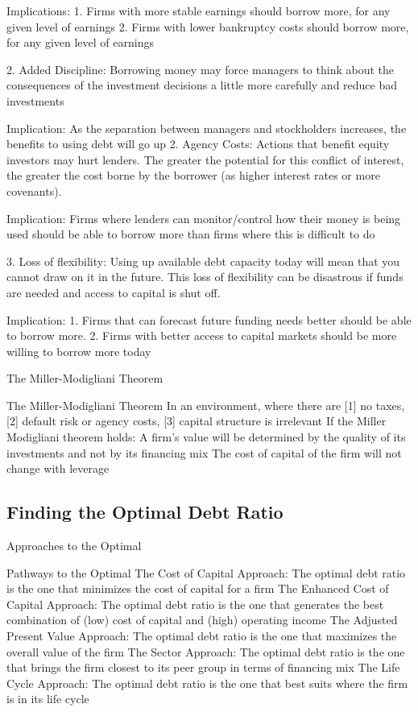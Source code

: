 \documentclass[10pt]{article}
\begin{document}
    Implications:
    1. Firms with more stable earnings should borrow more, for any given level of earnings
    2. Firms with lower bankruptcy costs should borrow more, for any given level of earnings


    2. Added Discipline: Borrowing money may force managers to think about the consequences of the investment decisions a little more carefully and reduce bad investments

    Implication: As the separation between managers and stockholders increases, the benefits to using debt will go up 
    2. Agency Costs: Actions that benefit equity investors may hurt lenders. The greater the potential for this conflict of interest, the greater the cost borne by the borrower (as higher interest rates or more covenants).

    Implication: Firms where lenders can monitor/control how their money is being used should be able to borrow more than firms where this is difficult to do

    3. Loss of flexibility: Using up available debt capacity today will mean that you cannot draw on it in the future. This loss of flexibility can be disastrous if funds are needed and access to capital is shut off.

    Implication:
    1. Firms that can forecast future funding needs better should be able to borrow more.
    2. Firms with better access to capital markets should be more willing to borrow more today

    \begin{core}{The Miller-Modigliani Theorem}

      The Miller-Modigliani Theorem
      In an environment, where there are [1] no taxes, [2] default risk or agency costs, [3] capital structure is irrelevant
      If the Miller Modigliani theorem holds:
      A firm’s value will be determined by the quality of its investments and not by its financing mix
      The cost of capital of the firm will not change with leverage

    \end{core}

  \subsection{Finding the Optimal Debt Ratio}

    \begin{core}{Approaches to the Optimal}

      Pathways to the Optimal
      The Cost of Capital Approach: The optimal debt ratio is the one that minimizes the cost of capital for a firm
      The Enhanced Cost of Capital Approach: The optimal debt ratio is the one that generates the best combination of (low) cost of capital and (high) operating income
      The Adjusted Present Value Approach: The optimal debt ratio is the one that maximizes the overall value of the firm
      The Sector Approach: The optimal debt ratio is the one that brings the firm closest to its peer group in terms of financing mix
      The Life Cycle Approach: The optimal debt ratio is the one that best suits where the firm is in its life cycle

    \end{core}
\end{document}
